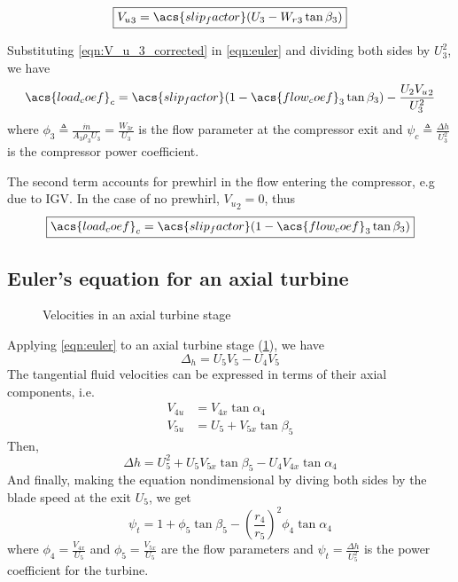 \documentclass[tcc]{subfiles}
\begin{document}
\begin{equation}
    \label{eqn:V_u_3_corrected}
    \boxed{{V_u}_3 = \acs{slip_factor}(U_3 - {W_r}_3 \tan\beta_3)}
\end{equation}

Substituting \cref{eqn:V_u_3_corrected} in \cref{eqn:euler} and dividing both sides by ${U_3^2}$, we have
\begin{equation}
    \acs{load_coef}_c = \acs{slip_factor}(1-\acs{flow_coef}_3\tan\beta_3) - \frac{U_2 {V_u}_2}{U_3^2} 
\end{equation}
where $\phi_3 \triangleq \frac{\dot{m}}{A_3 \rho_3 U_3} = \frac{W_{3r}}{U_3}$ is the flow parameter at the compressor exit
and $\psi_c \triangleq \frac{\Delta h}{U_3^2}$ is the compressor power coefficient.

The second term accounts for prewhirl in the flow entering the compressor, e.g due to \ac{IGV}.
In the case of no prewhirl, ${V_u}_2 = 0$, thus 
\begin{equation}
    \label{eqn:euler}
    \boxed{\acs{load_coef}_c = \acs{slip_factor}(1-\acs{flow_coef}_3\tan\beta_3)}
\end{equation}

\subsection{Euler's equation for an axial turbine}

\begin{figure}
    \caption{Velocities in an axial turbine stage}
    \label{fig:turbine_euler}
    
\end{figure}

Applying \cref{eqn:euler} to an axial turbine stage (\cref{fig:turbine_euler}), we have
\begin{equation}
    \Delta_h = U_5V_5-U_4V_5
\end{equation}
The tangential fluid velocities can be expressed in terms of their axial components, i.e.\
\begin{align}
    V_{4u} &= V_{4x} \tan\alpha_4 \\
    V_{5u} &= U_5 + V_{5x} \tan\beta_5
\end{align}
Then,
\begin{equation}
    \Delta h = U_5^2 + U_5 V_{5x}\tan\beta_5 - U_4 V_{4x}\tan\alpha_4
\end{equation}
And finally, making the equation nondimensional by diving both sides by the blade speed at the exit $U_5$, we get
\begin{equation}
    \boxed{\psi_t = 1 + \phi_5\tan\beta_5-\left(\frac{r_4}{r_5}\right)^2\phi_4\tan\alpha_4}
\end{equation}
where $\phi_4 = \frac{V_{4x}}{U_5}$ and $\phi_5 = \frac{V_{5x}}{U_5}$ are the flow parameters and
$\psi_t=\frac{\Delta h}{U_5^2}$ is the power coefficient for the turbine.
\end{document}
